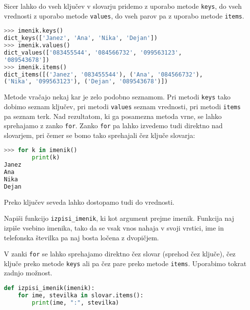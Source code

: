 Sicer lahko do vseh ključev v slovarju pridemo z uporabo metode \texttt{keys}, do vseh vrednosti z uporabo metode \texttt{values}, do vseh parov pa z uporabo metode \texttt{items}. 
\begin{lstlisting}[language=Python, showstringspaces=false]
>>> imenik.keys()
dict_keys(['Janez', 'Ana', 'Nika', 'Dejan'])
>>> imenik.values()
dict_values(['083455544', '084566732', '099563123', 
'089543678'])
>>> imenik.items()
dict_items([('Janez', '083455544'), ('Ana', '084566732'), 
('Nika', '099563123'), ('Dejan', '089543678')])
\end{lstlisting}
Metode vračajo nekaj kar je zelo podobno seznamom. Pri metodi \texttt{keys} tako dobimo seznam ključev, pri metodi \texttt{values} seznam vrednosti, pri metodi \texttt{items} pa seznam terk. Nad rezultatom, ki ga posamezna metoda vrne, se lahko sprehajamo z zanko \texttt{for}. Zanko \texttt{for} pa lahko izvedemo tudi direktno nad slovarjem, pri čemer se bomo tako sprehajali čez ključe slovarja:
\begin{lstlisting}[language=Python, showstringspaces=false]
>>> for k in imenik()
        print(k)
Janez
Ana
Nika
Dejan
\end{lstlisting}
Preko ključev seveda lahko dostopamo tudi do vrednosti. 
\begin{zgled}
Napiši funkcijo \texttt{izpisi\_imenik}, ki kot argument prejme imenik. Funkcija naj izpiše vsebino imenika, tako da se vsak vnos nahaja v svoji vrstici, ime in telefonska številka pa naj bosta ločena z dvopičjem.
\end{zgled}
\begin{resitev}
V zanki \texttt{for} se lahko sprehajamo direktno čez slovar (sprehod čez ključe), čez ključe preko metode \texttt{keys} ali pa čez pare preko metode \texttt{items}. Uporabimo tokrat zadnjo možnost.
\begin{lstlisting}[language=Python, showstringspaces=false]
def izpisi_imenik(imenik):
    for ime, stevilka in slovar.items():
        print(ime, ":", stevilka)   
\end{lstlisting}
\end{resitev}

